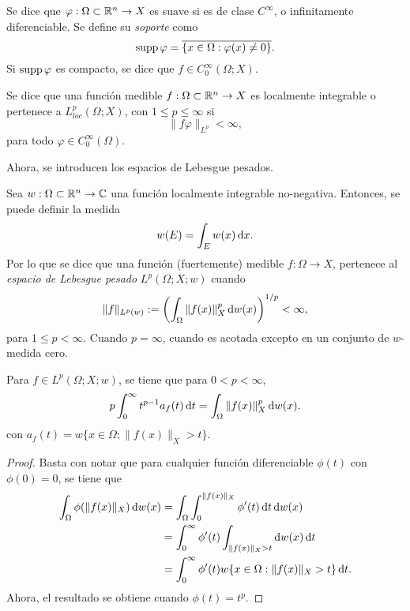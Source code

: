 \begin{definition}
		Se dice que $\varphi:\Omega\subset\mathbb{R}^n\rightarrow X$ es suave si es de clase $C^\infty$, o infinitamente diferenciable.  Se define su \textit{soporte} como 
		\begin{equation*}
			\operatorname{supp} \varphi = \overline{\{x\in\Omega:\varphi(x)\neq 0\}}.
		\end{equation*}
		Si $\operatorname{supp} \varphi$ es compacto, se dice que $f\in C^\infty_0(\Omega;X)$.
\end{definition}
\begin{definition}
	Se dice que una función medible $f:\Omega\subset\mathbb{R}^n\rightarrow X$ es localmente integrable o pertenece a $L^{p}_{loc}(\Omega; X)$, con $1\leq p\leq\infty$ si 
	\begin{equation*}
		\|f\varphi\|_{L^p} < \infty,
	\end{equation*} 
	para todo $\varphi\in C^\infty_0(\Omega)$.
\end{definition}
Ahora, se introducen los espacios de Lebesgue pesados.
\begin{definition}
	Sea $w:\Omega\subset\mathbb{R}^n\to\mathbb{C}$ una función localmente integrable no-negativa. Entonces, se puede definir la medida
	\begin{equation*}
		w(E) = \int_E w(x)\mathop{}\!\mathrm{d} x.
	\end{equation*}
	Por lo que se dice que una función (fuertemente) medible $f:\Omega\to X$, pertenece al \textit{espacio de Lebesgue pesado} $L^p(\Omega;X;w)$ cuando 
	\begin{equation*}
		\|f\|_{L^p(w)} :=\left( \int_\Omega \|f(x)\|_X^p \mathop{}\!\mathrm{d} w(x)\right)^{1/p} < \infty,
	\end{equation*}
	para $1\leq p<\infty$. Cuando $p=\infty$, cuando es acotada excepto en un conjunto de $w$-medida cero.
\end{definition}
\begin{proposition}
	Para $f\in L^p(\Omega;X;w)$, se tiene que para $0< p<\infty$,
	\begin{equation*}
		p\int_0^\infty t^{p-1} a_f(t) \mathop{}\!\mathrm{d} t = \int_\Omega \|f(x)\|_X^p \mathop{}\!\mathrm{d} w(x).
	\end{equation*}
	con $a_f(t) = w\{x\in\Omega: \|f(x)\|_X>t\}$.
\end{proposition}
\begin{proof}
	Basta con notar que para cualquier función diferenciable $\phi(t)$ con $\phi(0)=0$, se tiene que
	\begin{align*}
		\int_\Omega \phi(\|f(x)\|_X) \mathop{}\!\mathrm{d} w(x) & = \int_\Omega \int_0^{\|f(x)\|_X} \phi'(t) \mathop{}\!\mathrm{d} t \mathop{}\!\mathrm{d} w(x) \\
		& = \int_0^\infty \phi'(t) \int_{\|f(x)\|_X>t}  \mathop{}\!\mathrm{d} w(x) \mathop{}\!\mathrm{d} t \\
		& = \int_0^\infty \phi'(t) w\{x\in\Omega: \|f(x)\|_X>t\} \mathop{}\!\mathrm{d} t.
	\end{align*}
	Ahora, el resultado se obtiene cuando $\phi(t) = t^p$.
\end{proof}
